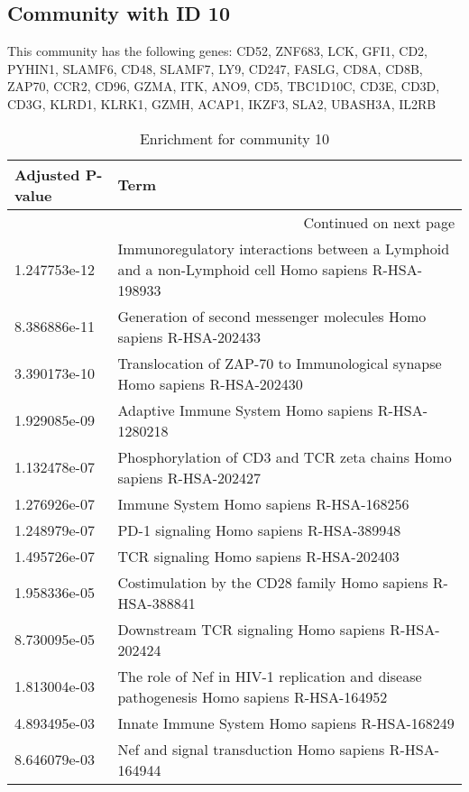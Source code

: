 \subsection*{Community with ID 10}
This community has the following genes: CD52, ZNF683, LCK, GFI1, CD2, PYHIN1, SLAMF6, CD48, SLAMF7, LY9, CD247, FASLG, CD8A, CD8B, ZAP70, CCR2, CD96, GZMA, ITK, ANO9, CD5, TBC1D10C, CD3E, CD3D, CD3G, KLRD1, KLRK1, GZMH, ACAP1, IKZF3, SLA2, UBASH3A, IL2RB
\\
\begin{longtable}{p{2.4cm}p{14.5cm}}
\caption{Enrichment for community 10}\\
\toprule
Adjusted \newline P-value &                                                                                                Term \\
\midrule
\endhead
\midrule
\multicolumn{2}{r}{{Continued on next page}} \\
\midrule
\endfoot

\bottomrule
\endlastfoot
             1.247753e-12 &  Immunoregulatory interactions between a Lymphoid and a non-Lymphoid cell Homo sapiens R-HSA-198933 \\
             8.386886e-11 &                                  Generation of second messenger molecules Homo sapiens R-HSA-202433 \\
             3.390173e-10 &                          Translocation of ZAP-70 to Immunological synapse Homo sapiens R-HSA-202430 \\
             1.929085e-09 &                                                   Adaptive Immune System Homo sapiens R-HSA-1280218 \\
             1.132478e-07 &                                Phosphorylation of CD3 and TCR zeta chains Homo sapiens R-HSA-202427 \\
             1.276926e-07 &                                                             Immune System Homo sapiens R-HSA-168256 \\
             1.248979e-07 &                                                            PD-1 signaling Homo sapiens R-HSA-389948 \\
             1.495726e-07 &                                                             TCR signaling Homo sapiens R-HSA-202403 \\
             1.958336e-05 &                                          Costimulation by the CD28 family Homo sapiens R-HSA-388841 \\
             8.730095e-05 &                                                  Downstream TCR signaling Homo sapiens R-HSA-202424 \\
             1.813004e-03 &             The role of Nef in HIV-1 replication and disease pathogenesis Homo sapiens R-HSA-164952 \\
             4.893495e-03 &                                                      Innate Immune System Homo sapiens R-HSA-168249 \\
             8.646079e-03 &                                               Nef and signal transduction Homo sapiens R-HSA-164944 \\
\end{longtable}


